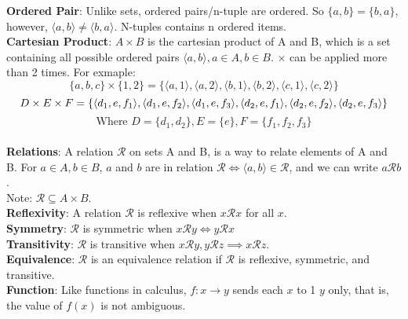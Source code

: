 \documentclass{article}
\begin{document}
\noindent
{
    \large

    \textbf{Ordered Pair}: Unlike sets, ordered pairs/n-tuple are ordered. So $\{a,b\} = \{b,a\}$, 
    however, $\langle a, b \rangle \not = \langle b, a \rangle$. N-tuples contains n ordered items.\\

    \textbf{Cartesian Product}: $A \times B$ is the cartesian product of A and B, which is a set containing 
    all possible ordered pairs $\langle a, b \rangle, a\in A, b \in B$. $\times$ can be applied more than 2 times. For exmaple:
    $$
    \{a, b, c\} \times \{1, 2\} = \{
        \langle a, 1 \rangle,
        \langle a, 2 \rangle,
        \langle b, 1 \rangle,
        \langle b, 2 \rangle,
        \langle c, 1 \rangle,
        \langle c, 2 \rangle\}
    $$
    $$
    D \times E \times F = \\
    \{
        \langle d_1, e, f_1 \rangle,
        \langle d_1, e, f_2 \rangle,
        \langle d_1, e, f_3 \rangle,
        \langle d_2, e, f_1 \rangle,
        \langle d_2, e, f_2 \rangle,
        \langle d_2, e, f_3 \rangle
    \}
    $$
    $$
    \text{Where }D = \{d_1, d_2\}, E = \{e\}, F = \{f_1, f_2, f_3\}
    $$\\

    \textbf{Relations}: A relation $\mathcal{R}$ on sets A and B, is a way
    to relate elements of A and B. For $a \in A, b\in B$, $a$ and $b$ 
    are in relation $\mathcal{R} \iff \langle a, b \rangle \in \mathcal{R}$, and 
    we can write $a\mathcal{R}b$.\\     Note: $\mathcal{R} \subseteq A \times B$.\\

    \textbf{Reflexivity}: A relation $\mathcal{R}$ is reflexive when $x\mathcal{R}x$ for all $x$.\\

    \textbf{Symmetry}: $\mathcal{R}$ is symmetric when $x\mathcal{R}y \iff y\mathcal{R}x$\\

    \textbf{Transitivity}: $\mathcal{R}$ is transitive when $x\mathcal{R}y, y\mathcal{R}z \implies x\mathcal{R}z$.\\

    \textbf{Equivalence}: $\mathcal{R}$ is an equivalence relation if $\mathcal{R}$ is 
    reflexive, symmetric, and transitive.\\

    \textbf{Function}: Like functions in calculus, $f: x \rightarrow y$ sends each $x$ to 1 $y$ only,
    that is, the value of $f(x)$ is not ambiguous.

    }
\end{document}
